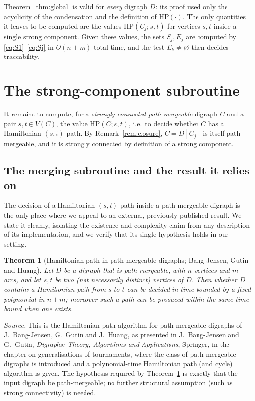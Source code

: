\documentclass[12pt]{article}
\newtheorem{theorem}{Theorem}
\theoremstyle{definition}
\begin{document}
Theorem~\ref{thm:global} is valid for \emph{every} digraph $D$: its proof used
only the acyclicity of the condensation and the definition of
$\mathrm{HP}(\cdot)$. The only quantities it leaves to be computed are the values
$\mathrm{HP}(C_{j};s,t)$ for vertices $s,t$ inside a single strong component.
Given these values, the sets $S_{j},E_{j}$ are computed by
\eqref{eq:S1}--\eqref{eq:Sj} in $O(n+m)$ total time, and the test
$E_{k}\neq\varnothing$ then decides traceability.

\section{The strong-component subroutine}\label{sec:component}

It remains to compute, for a \emph{strongly connected path-mergeable} digraph $C$
and a pair $s,t\in V(C)$, the value $\mathrm{HP}(C;s,t)$, i.e.\ to decide whether
$C$ has a Hamiltonian $(s,t)$-path. By Remark~\ref{rem:closure}, $C=D[C_{j}]$ is
itself path-mergeable, and it is strongly connected by definition of a strong
component.

\subsection{The merging subroutine and the result it relies on}

The decision of a Hamiltonian $(s,t)$-path inside a path-mergeable digraph is the
only place where we appeal to an external, previously published result. We state
it cleanly, isolating the existence-and-complexity claim from any description of
its implementation, and we verify that its single hypothesis holds in our setting.

\begin{theorem}[Hamiltonian path in path-mergeable digraphs; Bang-Jensen, Gutin
and Huang]\label{thm:bgh}
Let $D$ be a digraph that is path-mergeable, with $n$ vertices and $m$ arcs, and
let $s,t$ be two (not necessarily distinct) vertices of $D$. Then whether $D$
contains a Hamiltonian path from $s$ to $t$ can be decided in time bounded by a
fixed polynomial in $n+m$; moreover such a path can be produced within the same
time bound when one exists.
\end{theorem}

\noindent\emph{Source.} This is the Hamiltonian-path algorithm for path-mergeable
digraphs of J.~Bang-Jensen, G.~Gutin and J.~Huang, as presented in
J.~Bang-Jensen and G.~Gutin, \emph{Digraphs: Theory, Algorithms and
Applications}, Springer, in the chapter on generalisations of tournaments, where
the class of path-mergeable digraphs is introduced and a polynomial-time
Hamiltonian path (and cycle) algorithm is given. The hypothesis required by
Theorem~\ref{thm:bgh} is exactly that the input digraph be path-mergeable; no
further structural assumption (such as strong connectivity) is needed.
\end{document}
